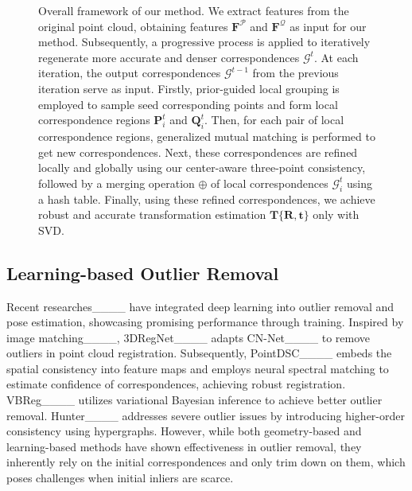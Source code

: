 \begin{figure*}[t]
    \caption{
       Overall framework of our method.
       We extract features from the original point cloud, 
       obtaining features $\mathbf{{F} }^{\mathcal{P}}$ and $\mathbf{{F} }^{\mathcal{Q}}$ 
       as input for our method. 
       Subsequently, a progressive 
       process is applied to iteratively regenerate more accurate and denser 
       correspondences $\mathcal{{G}}^{t}$. At each iteration, the output correspondences $\mathcal{{G}}^{t-1}$ from the previous 
       iteration serve as input. Firstly, prior-guided local grouping is employed to sample 
       seed corresponding points and form local correspondence regions 
       $\mathbf{P}^{t}_i$ and $\mathbf{Q}^{t}_i$. Then, for each pair of local correspondence regions, 
       generalized mutual matching is performed to get new correspondences. Next, these correspondences are refined locally and globally using our center-aware three-point consistency, 
       followed by a merging operation $\oplus$ of local correspondences $\mathcal{{G}}^{t}_{i}$ using a hash table.
       Finally, using these refined correspondences,
       we achieve robust and accurate transformation estimation $\mathbf T\{\mathbf R,\mathbf t\}$ only with SVD.
       }
    \label{fig1}
 \end{figure*}

\subsection{Learning-based Outlier Removal}
Recent researches____ have integrated 
deep learning into outlier removal and pose estimation, 
showcasing promising performance through training. 
Inspired by image matching____, 3DRegNet____ adapts CN-Net____ to remove outliers in point cloud registration. Subsequently, PointDSC____ embeds the spatial consistency 
into feature maps and employs neural spectral matching to estimate confidence of correspondences, 
achieving robust registration. VBReg____ utilizes variational Bayesian inference 
to achieve better outlier removal. Hunter____ addresses severe outlier issues 
by introducing higher-order consistency using hypergraphs. However, while both geometry-based 
and learning-based methods have shown effectiveness in outlier removal, 
they inherently rely on the initial correspondences and only trim down on them, 
which poses challenges when initial inliers are scarce.